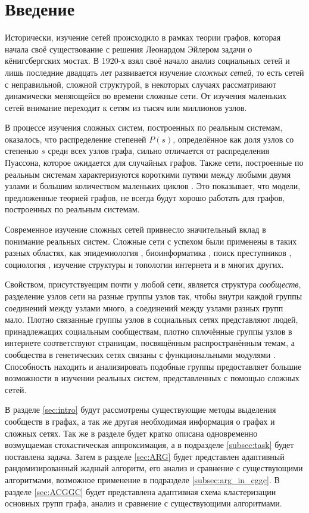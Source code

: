 \section*{Введение}

Исторически, изучение сетей происходило в рамках теории графов, которая начала своё существование с решения Леонардом Эйлером задачи о кёнигсбергских мостах. В 1920-х взял своё начало анализ социальных сетей и лишь последние двадцать лет развивается изучение \emph{сложных сетей}, то есть сетей с неправильной, сложной структурой, в некоторых случаях рассматривают динамически меняющейся во времени сложные сети. От изучения маленьких сетей внимание переходит к сетям из тысяч или миллионов узлов.

В процессе изучения сложных систем, построенных по реальным системам, оказалось, что распределение степеней $P(s)$, определённое как доля узлов со степенью $s$ среди всех узлов графа, сильно отличается от распределения Пуассона, которое ожидается для случайных графов. Также сети, построенные по реальным системам характеризуются короткими путями между любыми двумя узлами и большим количеством маленьких циклов \cite{Boccaletti&al:2006}. Это показывает, что модели, предложенные теорией графов, не всегда будут хорошо работать для графов, построенных по реальным системам.

Современное изучение сложных сетей привнесло значительный вклад в понимание реальных систем. Сложные сети с успехом были применены в таких разных областях, как эпидемиология \cite{Moore&Newman:2000}, биоинформатика \cite{Zhao&al:2006}, поиск преступников \cite{Hong&al:2009}, социология \cite{Scott:2012}, изучение структуры и топологии интернета \cite{Faloutsos&al:1999, Broder&al:2000} и в многих других.

Свойством, присутствуещим почти у любой сети, является структура \emph{сообществ}, разделение узлов сети на разные группы узлов так, чтобы внутри каждой группы соединений между узлами много, а соединений между узлами разных групп мало. Плотно связанные группы узлов в социальных сетях представляют людей, принадлежащих социальным сообществам, плотно сплочённые группы узлов в интернете соответствуют страницам, посвящённым распространённым темам, а сообщества в генетических сетях связаны с функциональными модулями \cite{Boccaletti&al:2006}. Способность находить и анализировать подобные группы предоставляет большие возможности в изучении реальных систем, представленных с помощью сложных сетей.

В разделе \ref{sec:intro} будут рассмотрены существующие методы выделения сообществ в графах, а так же другая необходимая информация о графах и сложных сетях. Так же в разделе будет кратко описана одновременно возмущаемая стохастическая аппроксимация, а в подразделе \ref{subsec:task} будет поставлена задача. Затем в разделе \ref{sec:ARG} будет представлен адаптивный рандомизированный жадный алгоритм, его анализ и сравнение с существующими алгоритмами, возможное применение в подразделе \ref{subsec:arg_in_cggc}. В разделе \ref{sec:ACGGC} будет представлена адаптивная схема кластеризации основных групп графа, анализ и сравнение с существующими алгоритмами.